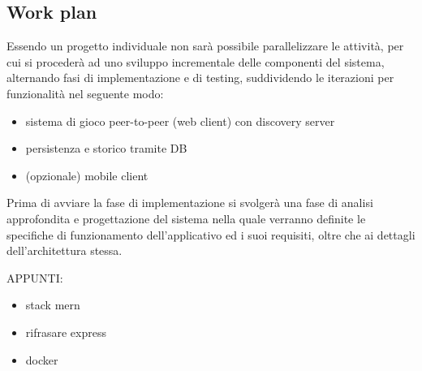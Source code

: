 \subsection{Work plan}
Essendo un progetto individuale non sarà possibile parallelizzare le attività, per cui si procederà ad uno sviluppo incrementale delle componenti del sistema,  alternando fasi di implementazione e di testing, suddividendo le iterazioni per funzionalità nel seguente modo:
\begin{itemize}
    \item sistema di gioco peer-to-peer (web client) con discovery server
    \item persistenza e storico tramite DB
    \item (opzionale) mobile client
\end{itemize}

Prima di avviare la fase di implementazione si svolgerà una fase di analisi approfondita e progettazione del sistema nella quale verranno definite le specifiche di funzionamento dell'applicativo ed i suoi requisiti, oltre che ai dettagli dell'architettura stessa.

APPUNTI:
\begin{itemize}
    \item stack mern
    \item rifrasare express
    \item docker
\end{itemize}
